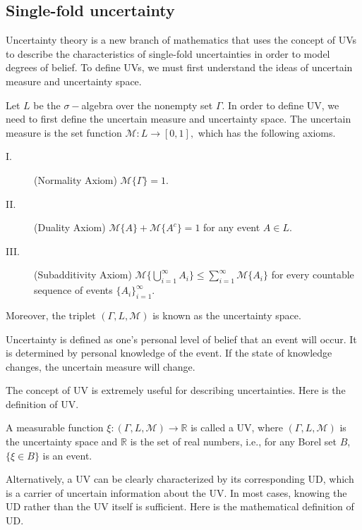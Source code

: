 \subsection{Single-fold uncertainty} Uncertainty theory is a new branch of mathematics that uses the concept of UVs to describe the characteristics of single-fold uncertainties in order to model degrees of belief. To define UVs, we must first understand the ideas of uncertain measure and uncertainty space.
\begin{definition}\cite{Liu 2015}\label{def.1}
Let $L$ be the $\sigma-$algebra over the nonempty set $\Gamma$. In order to define UV, we need to first define the uncertain measure and uncertainty space. The uncertain measure is the set function $\mathcal{M}:L\rightarrow[0,1],$ which has the following axioms.
\begin{description}
	\item[I.] (Normality Axiom) $\mathcal{M}\{\Gamma\}=1$.
	\item[II.] (Duality Axiom) $\mathcal{M}\{A\}+\mathcal{M}\{A^c\}=1$ for any event $A\in L$.
	\item[III.] (Subadditivity Axiom) $\mathcal{M}\big\{ \bigcup\limits_{i=1}^{\infty}A_i \big\} \leq \sum\limits_{i=1}^{\infty}\mathcal{M}\{A_i\}$ for every countable sequence of events $\{A_i\}_{i=1}^{\infty}$.
\end{description}
\par Moreover, the triplet $(\Gamma,L,\mathcal{M})$ is known as the uncertainty space.
\end{definition}
\begin{remark}\cite{Liu 2015}
	Uncertainty is defined as one's personal level of belief that an event will occur. It is determined by personal knowledge of the event. If the state of knowledge changes, the uncertain measure will change.
	\end{remark}
\par The concept of UV is extremely useful for describing uncertainties. Here is the definition of UV.
\begin{definition}\cite{Liu 2015}\label{def.2}
	 A measurable function $\xi:(\Gamma,L,\mathcal{M})\to \mathbb{R}$ is called a UV, where $(\Gamma,L,\mathcal{M})$ is the uncertainty space and $\mathbb{R}$ is the set of real numbers, i.e., for any Borel set $B$, $\{\xi\in B\}$ is an event.
\end{definition}
\par Alternatively, a UV can be clearly characterized by its corresponding UD, which is a carrier of uncertain information about the UV. In most cases, knowing the UD rather than the UV itself is sufficient. Here is the mathematical definition of UD.
